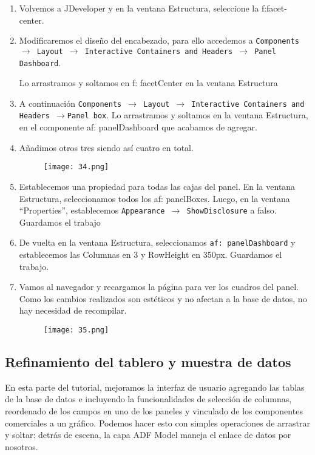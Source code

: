 \begin{enumerate}
	\item Volvemos a JDeveloper y en la ventana Estructura, seleccione la f:facet-center.
	\item Modificaremos el diseño del encabezado, para ello accedemos a \texttt{Components $\rightarrow$ Layout $\rightarrow$  Interactive Containers and Headers $\rightarrow$ Panel Dashboard}.

	Lo arrastramos y soltamos en f: facetCenter en la ventana Estructura
	\item A continuación \texttt{Components $\rightarrow$ Layout $\rightarrow$  Interactive Containers and Headers $\rightarrow$Panel box}. Lo arrastramos y soltamos en la ventana Estructura, en el componente af: panelDashboard que acabamos de agregar.
	\item Añadimos otros tres siendo así cuatro en total.
	\pagebreak
	\begin{figure}[!h]
	  \centering
	    \texttt{[image: 34.png]}
	\end{figure}
	\item Establecemos una propiedad para todas las cajas del panel. En la ventana Estructura, seleccionamos todos los af: panelBoxes. Luego, en la ventana ``Properties'', establecemos \texttt{Appearance $\rightarrow$ ShowDisclosure} a falso. Guardamos el trabajo
	\item De vuelta en la ventana Estructura, seleccionamos \texttt{af: panelDashboard} y establecemos las Columnas en 3 y RowHeight en 350px.  Guardamos el trabajo.
	\item Vamos al navegador y recargamos la página para ver los cuadros del panel. Como los cambios realizados son estéticos y no afectan a la base de datos, no hay necesidad de recompilar.
	\begin{figure}[!h]
	  \centering
	    \texttt{[image: 35.png]}
	\end{figure}
\end{enumerate}
\pagebreak

\subsection{Refinamiento del tablero y muestra de datos}
En esta parte del tutorial, mejoramos la interfaz de usuario agregando las tablas de la base de datos e incluyendo la funcionalidades de selección de columnas, reordenado de los campos en uno de los paneles y vinculado de los componentes comerciales a un gráfico.
Podemos hacer esto con simples operaciones de arrastrar y soltar: detrás de escena, la capa ADF Model maneja el enlace de datos por nosotros.

